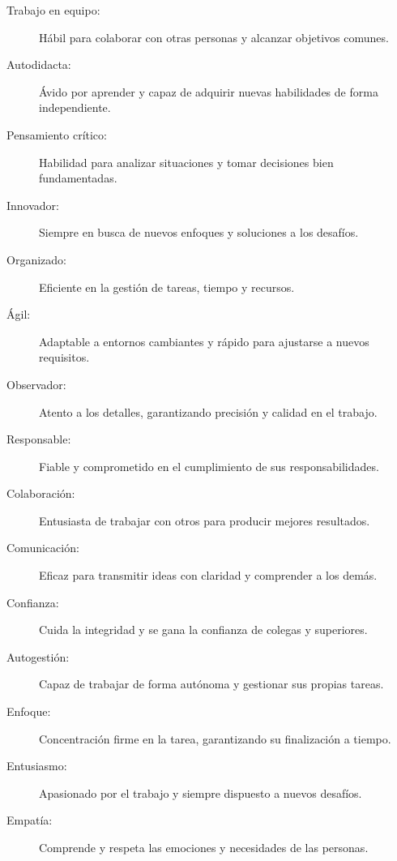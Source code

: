 
\begin{description}
    \item[Trabajo en equipo:] Hábil para colaborar con otras personas y alcanzar objetivos comunes.
    \item[Autodidacta:] Ávido por aprender y capaz de adquirir nuevas habilidades de forma independiente.
    \item[Pensamiento crítico:] Habilidad para analizar situaciones y tomar decisiones bien fundamentadas.
    \item[Innovador:] Siempre en busca de nuevos enfoques y soluciones a los desafíos.
    \item[Organizado:] Eficiente en la gestión de tareas, tiempo y recursos.
    \item[Ágil:] Adaptable a entornos cambiantes y rápido para ajustarse a nuevos requisitos.
    \item[Observador:] Atento a los detalles, garantizando precisión y calidad en el trabajo.
    \item[Responsable:] Fiable y comprometido en el cumplimiento de sus responsabilidades.
    \item[Colaboración:] Entusiasta de trabajar con otros para producir mejores resultados.
    \item[Comunicación:] Eficaz para transmitir ideas con claridad y comprender a los demás.
    \item[Confianza:] Cuida la integridad y se gana la confianza de colegas y superiores.
    \item[Autogestión:] Capaz de trabajar de forma autónoma y gestionar sus propias tareas.
    \item[Enfoque:] Concentración firme en la tarea, garantizando su finalización a tiempo.
    \item[Entusiasmo:] Apasionado por el trabajo y siempre dispuesto a nuevos desafíos.
    \item[Empatía:] Comprende y respeta las emociones y necesidades de las personas.
\end{description}
